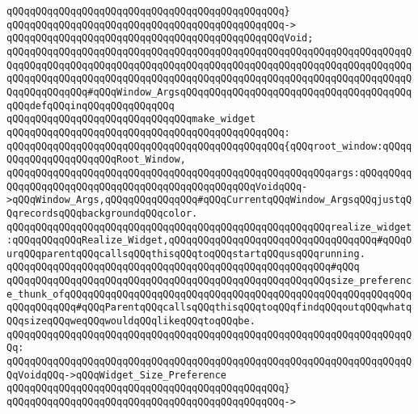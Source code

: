 \verb|qQQqqQQqqQQqqQQqqQQqqQQqqQQqqQQqqQQqqQQqqQQqqQQq}|\newline
\verb|qQQqqQQqqQQqqQQqqQQqqQQqqQQqqQQqqQQqqQQqqQQqqQQq->|\newline
\verb|qQQqqQQqqQQqqQQqqQQqqQQqqQQqqQQqqQQqqQQqqQQqqQQqVoid;|\newline
\verb|qQQqqQQqqQQqqQQqqQQqqQQqqQQqqQQqqQQqqQQqqQQqqQQqqQQqqQQqqQQqqQQqqQQqqQQqqQQqqQQqqQQqqQQqqQQqqQQqqQQqqQQqqQQqqQQqqQQqqQQqqQQqqQQqqQQqqQQqqQQqqQQqqQQqqQQqqQQqqQQqqQQqqQQqqQQqqQQqqQQqqQQqqQQqqQQqqQQqqQQqqQQqqQQqqQQqqQQqqQQqqQQq#qQQqWindow_ArgsqQQqqQQqqQQqqQQqqQQqqQQqqQQqqQQqqQQqqQQqqQQqdefqQQqinqQQqqQQqqQQqqQQq|\newline
\verb|qQQqqQQqqQQqqQQqqQQqqQQqqQQqqQQqmake_widget|\newline
\verb|qQQqqQQqqQQqqQQqqQQqqQQqqQQqqQQqqQQqqQQqqQQqqQQq:|\newline
\verb|qQQqqQQqqQQqqQQqqQQqqQQqqQQqqQQqqQQqqQQqqQQqqQQq{qQQqroot_window:qQQqqQQqqQQqqQQqqQQqqQQqRoot_Window,|\newline
\verb|qQQqqQQqqQQqqQQqqQQqqQQqqQQqqQQqqQQqqQQqqQQqqQQqqQQqqQQqargs:qQQqqQQqqQQqqQQqqQQqqQQqqQQqqQQqqQQqqQQqqQQqqQQqqQQqVoidqQQq->qQQqWindow_Args,qQQqqQQqqQQqqQQq#qQQqCurrentqQQqWindow_ArgsqQQqjustqQQqrecordsqQQqbackgroundqQQqcolor.|\newline
\verb|qQQqqQQqqQQqqQQqqQQqqQQqqQQqqQQqqQQqqQQqqQQqqQQqqQQqqQQqrealize_widget:qQQqqQQqqQQqRealize_Widget,qQQqqQQqqQQqqQQqqQQqqQQqqQQqqQQqqQQq#qQQqOurqQQqparentqQQqcallsqQQqthisqQQqtoqQQqstartqQQqusqQQqrunning.|\newline
\verb|qQQqqQQqqQQqqQQqqQQqqQQqqQQqqQQqqQQqqQQqqQQqqQQqqQQqqQQq#qQQq|\newline
\verb|qQQqqQQqqQQqqQQqqQQqqQQqqQQqqQQqqQQqqQQqqQQqqQQqqQQqqQQqsize_preference_thunk_ofqQQqqQQqqQQqqQQqqQQqqQQqqQQqqQQqqQQqqQQqqQQqqQQqqQQqqQQqqQQqqQQqqQQqqQQq#qQQqParentqQQqcallsqQQqthisqQQqtoqQQqfindqQQqoutqQQqwhatqQQqsizeqQQqweqQQqwouldqQQqlikeqQQqtoqQQqbe.|\newline
\verb|qQQqqQQqqQQqqQQqqQQqqQQqqQQqqQQqqQQqqQQqqQQqqQQqqQQqqQQqqQQqqQQqqQQqqQQq:|\newline
\verb|qQQqqQQqqQQqqQQqqQQqqQQqqQQqqQQqqQQqqQQqqQQqqQQqqQQqqQQqqQQqqQQqqQQqqQQqVoidqQQq->qQQqWidget_Size_Preference|\newline
\verb|qQQqqQQqqQQqqQQqqQQqqQQqqQQqqQQqqQQqqQQqqQQqqQQq}|\newline
\verb|qQQqqQQqqQQqqQQqqQQqqQQqqQQqqQQqqQQqqQQqqQQqqQQq->|\newline
